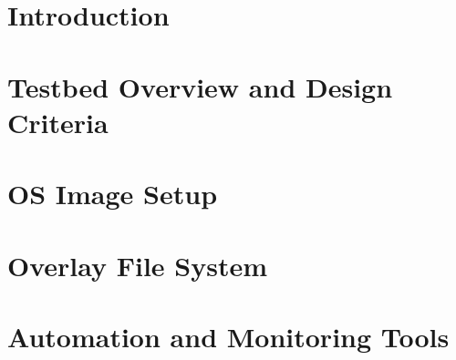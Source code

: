 \documentclass[electronics,article,submit,moreauthors,pdftex,10pt,a4paper]{mdpi}
\theoremstyle{mdpi}
\newcounter{ex}
\newcounter{re}
\theoremstyle{mdpidefinition}
\begin{document}
\newcommand*\Reactivatenumber{%
  \lst@AddToHook{OnNewLine}{%
   \let\thelstnumber\origthelstnumber%
   \advance\c@lstnumber\@ne\relax}%
}






\section{Introduction}


\section{Testbed Overview and Design Criteria}


\section{OS Image Setup}


\section{Overlay File System}


\section{Automation and Monitoring Tools}

\end{document}
